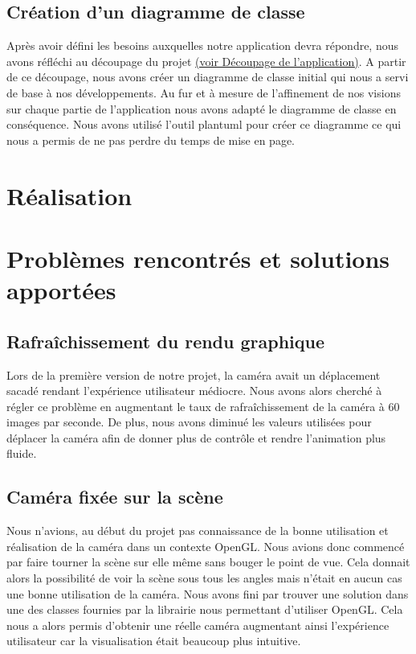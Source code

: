 \documentclass[11pt]{report}
\begin{document}
\subsection{Création d'un diagramme de classe}

Après avoir défini les besoins auxquelles notre application devra répondre, nous avons réfléchi au découpage du projet \hyperlink{découpage}{(voir Découpage de l'application)}.
A partir de ce découpage, nous avons créer un diagramme de classe initial qui nous a servi de base à nos développements. 
Au fur et à mesure de l'affinement de nos visions sur chaque partie de l'application nous avons adapté le diagramme de classe en conséquence.
Nous avons utilisé l'outil plantuml pour créer ce diagramme ce qui nous a permis de ne pas perdre du temps de mise en page. 

\section{Réalisation}

\section{Problèmes rencontrés et solutions apportées}

\subsection{Rafraîchissement du rendu graphique}

Lors de la première version de notre projet, la caméra avait un déplacement sacadé rendant l'expérience utilisateur médiocre. Nous avons alors
cherché à régler ce problème en augmentant le taux de rafraîchissement de la caméra à 60 images par seconde. De plus, nous avons diminué
les valeurs utilisées pour déplacer la caméra afin de donner plus de contrôle et rendre l'animation plus fluide.

\subsection{Caméra fixée sur la scène}

Nous n'avions, au début du projet pas connaissance de la bonne utilisation et réalisation de la caméra dans un contexte OpenGL. Nous avions
donc commencé par faire tourner la scène sur elle même sans bouger le point de vue. Cela donnait alors la possibilité de voir la scène sous tous les angles mais n'était en aucun cas une bonne utilisation de la caméra. Nous avons fini par trouver une solution dans une des classes fournies par la librairie nous permettant d'utiliser OpenGL. Cela nous a alors permis d'obtenir une réelle caméra augmentant ainsi l'expérience utilisateur car la visualisation était beaucoup plus intuitive.
\end{document}
